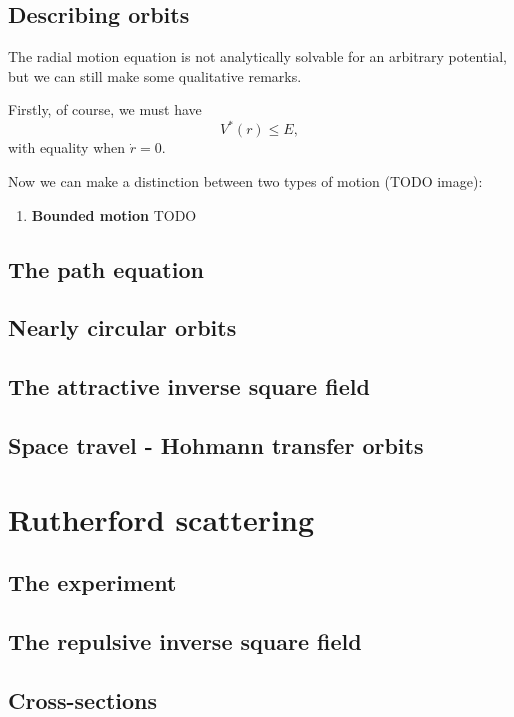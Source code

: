 \subsection{Describing orbits}
The radial motion equation is not analytically solvable for an arbitrary potential, but we can still make some qualitative remarks.

Firstly, of course, we must have
\[ V^*(r) \leq E, \]
with equality when $\dot{r} = 0$.

Now we can make a distinction between two types of motion (TODO image):
\begin{enumerate}
\item \textbf{Bounded motion} TODO
\end{enumerate}


\subsection{The path equation}

\subsection{Nearly circular orbits}

\subsection{The attractive inverse square field}

\subsection{Space travel - Hohmann transfer orbits}


\section{Rutherford scattering}
\subsection{The experiment}
\subsection{The repulsive inverse square field}
\subsection{Cross-sections}


